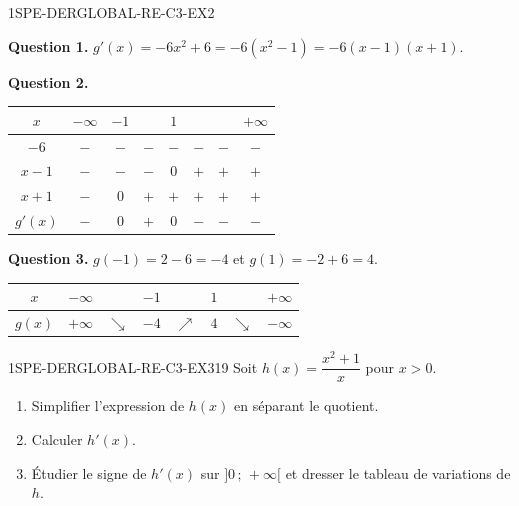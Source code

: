 \begin{corrige}{1SPE-DERGLOBAL-RE-C3-EX2}

\textbf{Question 1.}
$g'(x) = -6x^2 + 6 = -6(x^2 - 1) = -6(x-1)(x+1).$

\textbf{Question 2.}

\begin{center}
\begin{tabular}{|c|ccccccc|}
\hline
$x$ & $-\infty$ & $-1$ & & $1$ & & & $+\infty$ \\
\hline
$-6$ & $-$ & $-$ & $-$ & $-$ & $-$ & $-$ & $-$ \\
$x-1$ & $-$ & $-$ & $-$ & $0$ & $+$ & $+$ & $+$ \\
$x+1$ & $-$ & $0$ & $+$ & $+$ & $+$ & $+$ & $+$ \\
$g'(x)$ & $-$ & $0$ & $+$ & $0$ & $-$ & $-$ & $-$ \\
\hline
\end{tabular}
\end{center}

\textbf{Question 3.}
$g(-1) = 2 - 6 = -4$ et $g(1) = -2 + 6 = 4.$

\begin{center}
\begin{tabular}{|c|ccccccc|}
\hline
$x$ & $-\infty$ & & $-1$ & & $1$ & & $+\infty$ \\
\hline
$g(x)$ & $+\infty$ & $\searrow$ & $-4$ & $\nearrow$ & $4$ & $\searrow$ & $-\infty$ \\
\hline
\end{tabular}
\end{center}

\end{corrige}


\begin{exercice}{1SPE-DERGLOBAL-RE-C3-EX3}{1}{9}
Soit $h(x) = \dfrac{x^2 + 1}{x}$ pour $x > 0$.
\begin{enumerate}
  \item Simplifier l'expression de $h(x)$ en séparant le quotient.
  \item Calculer $h'(x)$.
  \item Étudier le signe de $h'(x)$ sur $]0\,;\,+\infty[$ et dresser le tableau de variations de $h$.
\end{enumerate}
\end{exercice}


